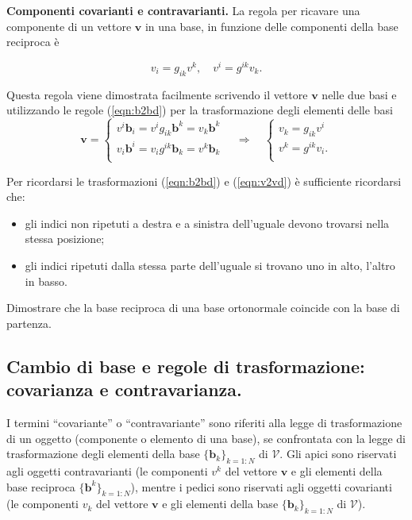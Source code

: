 \vspace{5pt} \noindent
\textbf{Componenti covarianti e contravarianti.} La regola per ricavare una componente di un vettore $\bm{v}$ in una base, in funzione delle componenti della base reciproca è
\begin{fBox}
  \begin{equation}\label{eqn:v2vd}
   v_i = g_{ik} v^k , \quad
   v^i = g^{ik} v_k .
  \end{equation}
\end{fBox}
%
Questa regola viene dimostrata facilmente scrivendo il vettore $\bm{v}$ nelle due basi e utilizzando le regole (\ref{eqn:b2bd}) per la trasformazione degli elementi delle basi
  \begin{equation}
   \bm{v} = \begin{cases}
     v^i \bm{b}_i = v^i g_{ik} \bm{b}^k = v_k \bm{b}^k \\
     v_i \bm{b}^i = v_i g^{ik} \bm{b}_k = v^k \bm{b}_k\\
   \end{cases} \quad \Rightarrow \quad
   \begin{cases}
     v_k = g_{ik} v^i   \\
     v^k = g^{ik} v_i . \\
   \end{cases}
  \end{equation}
%
\begin{remark}
  Per ricordarsi le trasformazioni (\ref{eqn:b2bd}) e (\ref{eqn:v2vd}) è sufficiente ricordarsi che:
  \begin{itemize}
    \item gli indici non ripetuti a destra e a sinistra dell'uguale devono trovarsi nella stessa posizione;
    \item gli indici ripetuti dalla stessa parte dell'uguale si trovano uno in alto, l'altro in basso.
  \end{itemize}
\end{remark}

\begin{exercise}
 Dimostrare che la base reciproca di una base ortonormale coincide con la base di partenza.
\end{exercise}

  \subsection{Cambio di base e regole di trasformazione: covarianza e contravarianza.}\label{ch:tensori:cambio_base}
  I termini ``covariante'' o ``contravariante'' sono riferiti alla legge di trasformazione di un oggetto (componente o elemento di una base), se confrontata con la legge di trasformazione degli elementi della base $\{ \bm{b}_k \}_{k=1:N}$ di $\mathcal{V}$.
  Gli apici sono riservati agli oggetti contravarianti (le componenti $v^k$ del vettore $\bm{v}$ e gli elementi della base reciproca $\{ \bm{b}^k \}_{k=1:N}$), mentre i pedici sono riservati agli oggetti covarianti (le componenti $v_k$ del vettore $\bm{v}$ e gli elementi della base $\{ \bm{b}_k \}_{k=1:N}$ di $\mathcal{V}$).
  
